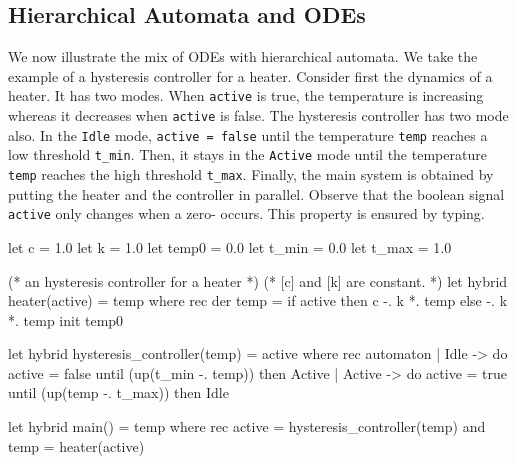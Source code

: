 \documentclass[11pt,titlepage,twoside]{report}
\newcommand{\Marc}[1]{{\bf Marc.} {#1} {\bf Fin}}
\begin{document}
\subsection{Hierarchical Automata and ODEs\label{hautoodes}} %

We now illustrate the mix of ODEs with hierarchical automata. We take
the example of a hysteresis controller for a heater.  Consider first
the dynamics of a heater. It has two modes. When \texttt{active} is true,
the temperature is increasing whereas it decreases when
\texttt{active} is false. The hysteresis controller has two mode also. In the
\texttt{Idle} mode, \texttt{active = false} until the temperature
\texttt{temp} reaches a low threshold \verb-t_min-. Then, it stays in
the \texttt{Active} mode until the temperature \verb-temp- reaches the
high threshold \verb-t_max-. Finally, the main system is obtained by
putting the heater and the controller in parallel. Observe that the
boolean signal \verb-active- only changes when a zero-
occurs. This property is ensured by typing.
%
%
%
%
%
%
%
\begin{chklisting}
let c = 1.0
let k = 1.0
let temp0 = 0.0
let t_min = 0.0
let t_max = 1.0
\end{chklisting}
\begin{chklisting}[continue]
(* an hysteresis controller for a heater *)
(* [c] and [k] are constant. *)
let hybrid heater(active) = temp where
  rec der temp = if active then c -. k *. temp else -. k *. temp init temp0

let hybrid hysteresis_controller(temp) = active where
  rec automaton
      | Idle -> do active = false until (up(t_min -. temp)) then Active
      | Active -> do active = true until (up(temp -. t_max)) then Idle
 
let hybrid main() = temp where
  rec active = hysteresis_controller(temp)
  and temp = heater(active)
\end{chklisting}
\end{document}
